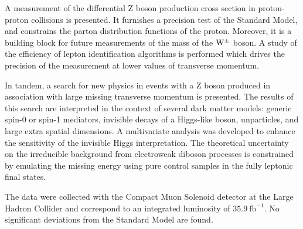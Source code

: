 % 
% 
%

A measurement of the differential Z boson production cross section in proton-proton collisions
is presented.
It furnishes a precision test of the Standard Model, and constrains the parton distribution functions of the proton.
Moreover, it is a building block for future measurements of the mass of the $\mathrm{W}^{\pm}$ boson.
A study of the efficiency of lepton identification algorithms is performed which
drives the precision of the measurement at lower values of transverse momentum.

In tandem, a search for new physics in events with a Z boson produced in association with
large missing transverse momentum is presented.
The results of this search are interpreted in the context of several dark matter models:
generic spin-0 or spin-1 mediators, invisible decays of a Higgs-like boson,
unparticles, and large extra spatial dimensions.
A multivariate analysis was developed to enhance the sensitivity of the invisible Higgs interpretation.
The theoretical uncertainty on the irreducible background from electroweak diboson processes is constrained by
emulating the missing energy using pure control samples in the fully leptonic final states.

The data were collected with the Compact Muon Solenoid detector at the Large Hadron Collider and correspond to an
integrated luminosity of $35.9~\mathrm{fb}^{-1}$. No significant deviations from the Standard Model are found.



